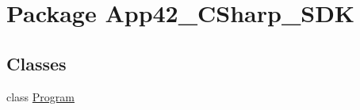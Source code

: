 \hypertarget{namespace_app42___c_sharp___s_d_k}{\section{Package App42\+\_\+\+C\+Sharp\+\_\+\+S\+D\+K}
\label{namespace_app42___c_sharp___s_d_k}
}
\subsection*{Classes}
\begin{DoxyCompactItemize}
\item 
class \hyperlink{class_app42___c_sharp___s_d_k_1_1_program}{Program}
\end{DoxyCompactItemize}
